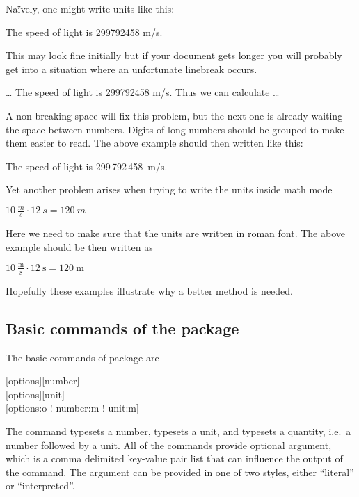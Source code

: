 Naïvely, one might write units like this:
\begin{example}[examplewidth=6cm]
The speed of light
is 299792458 m/s.
\end{example}
\noindent This may look fine initially but if your document gets longer you will probably
get into a situation where an unfortunate linebreak occurs.
\begin{example}[examplewidth=6cm]
\ldots{} The speed of light
is 299792458 m/s. Thus we
can calculate \ldots
\end{example}
\noindent A non-breaking space will fix this problem, but the next one is already waiting---the space between numbers. Digits of
long numbers should be grouped to make them easier to read. The above example
should then written like this:
\begin{example}[examplewidth=6cm]
The speed of light is
299\,792\,458~m/s.
\end{example}
\noindent Yet another problem arises when trying to write the units inside math
mode
\begin{example}[examplewidth=6cm]
$10~\frac{m}{s} \cdot 12~s = 120~m$
\end{example}
\noindent Here we need to make sure that the units are written in roman font.
The above example should be then written as
\begin{example}[examplewidth=6cm]
$10~\frac{\mathrm{m}}{\mathrm{s}} 
  \cdot 12~\mathrm{s} 
  = 120~\mathrm{m}$
\end{example}
\noindent Hopefully these examples illustrate why a better method is needed.

\subsection{Basic commands of the  package}

The basic commands of  package are
\begin{lscommand}
  [options][number]\\
  [options][unit]\\
  [options:o ! number:m ! unit:m]
\end{lscommand}
The  command typesets a number,  typesets a unit, and 
typesets a quantity, i.e.\ a number followed by a unit. All of the commands
provide optional  argument, which is a comma delimited key-value pair
list that can influence the output of the command. The  argument can
be provided in one of two styles, either \enquote{literal} or
\enquote{interpreted}.

